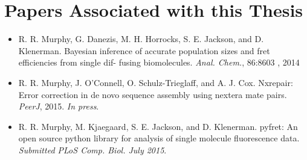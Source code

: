\chapter{Papers Associated with this Thesis}
\label{app:papers}

\begin{itemize}

\item[]R. R. Murphy, G. Danezis, M. H. Horrocks, S. E. Jackson, and D. Klenerman.
Bayesian inference of accurate population sizes and fret efficiencies from single dif-
fusing biomolecules. \emph{Anal. Chem.}, 86:8603 , 2014~\cite{murphy14}

\item[]R. R. Murphy, J. O’Connell, O. Schulz-Trieglaff, and A. J. Cox. 
Nxrepair: Error correction in de novo sequence assembly using nextera mate pairs. \emph{PeerJ}, 2015. \emph{In press}.~\cite{murphy2015}

\item[]R. R. Murphy, M. Kjaegaard, S. E. Jackson, and D. Klenerman. 
pyfret: An open source python library for analysis of single molecule fluorescence data.  \emph{Submitted PLoS Comp. Biol. July 2015}.~\cite{murphy2015_2}

\end{itemize}
